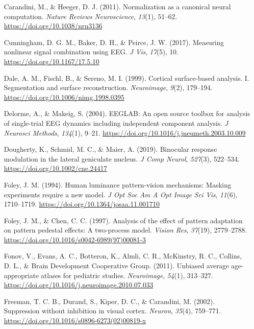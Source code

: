 \documentclass[
]{article}
\newlength{\cslhangindent}
\newlength{\cslentryspacingunit} %
\newenvironment{CSLReferences}[2] %
 {%
  \setlength{\parindent}{0pt}
  \ifodd #1
  \let\oldpar\par
  \def\par{\hangindent=\cslhangindent\oldpar}
  \fi
  \setlength{\parskip}{#2\cslentryspacingunit}
 }%
 {}
\begin{document}
\begin{CSLReferences}{1}{0}
\leavevmode{}%
Carandini, M., \& Heeger, D. J. (2011). Normalization as a canonical neural computation. \emph{Nature Reviews Neuroscience}, \emph{13}(1), 51--62. \url{https://doi.org/10.1038/nrn3136}

\leavevmode{}%
Cunningham, D. G. M., Baker, D. H., \& Peirce, J. W. (2017). Measuring nonlinear signal combination using EEG. \emph{J Vis}, \emph{17}(5), 10. \url{https://doi.org/10.1167/17.5.10}

\leavevmode{}%
Dale, A. M., Fischl, B., \& Sereno, M. I. (1999). Cortical surface-based analysis. I. Segmentation and surface reconstruction. \emph{Neuroimage}, \emph{9}(2), 179--194. \url{https://doi.org/10.1006/nimg.1998.0395}

\leavevmode{}%
Delorme, A., \& Makeig, S. (2004). EEGLAB: An open source toolbox for analysis of single-trial EEG dynamics including independent component analysis. \emph{J Neurosci Methods}, \emph{134}(1), 9--21. \url{https://doi.org/10.1016/j.jneumeth.2003.10.009}

\leavevmode{}%
Dougherty, K., Schmid, M. C., \& Maier, A. (2019). Binocular response modulation in the lateral geniculate nucleus. \emph{J Comp Neurol}, \emph{527}(3), 522--534. \url{https://doi.org/10.1002/cne.24417}

\leavevmode{}%
Foley, J. M. (1994). Human luminance pattern-vision mechanisms: Masking experiments require a new model. \emph{J Opt Soc Am A Opt Image Sci Vis}, \emph{11}(6), 1710--1719. \url{https://doi.org/10.1364/josaa.11.001710}

\leavevmode{}%
Foley, J. M., \& Chen, C. C. (1997). Analysis of the effect of pattern adaptation on pattern pedestal effects: A two-process model. \emph{Vision Res}, \emph{37}(19), 2779--2788. \url{https://doi.org/10.1016/s0042-6989(97)00081-3}

\leavevmode{}%
Fonov, V., Evans, A. C., Botteron, K., Almli, C. R., McKinstry, R. C., Collins, D. L., \& Brain Development Cooperative Group. (2011). Unbiased average age-appropriate atlases for pediatric studies. \emph{Neuroimage}, \emph{54}(1), 313--327. \url{https://doi.org/10.1016/j.neuroimage.2010.07.033}

\leavevmode{}%
Freeman, T. C. B., Durand, S., Kiper, D. C., \& Carandini, M. (2002). Suppression without inhibition in visual cortex. \emph{Neuron}, \emph{35}(4), 759--771. \url{https://doi.org/10.1016/s0896-6273(02)00819-x}


\end{CSLReferences}
\end{document}
